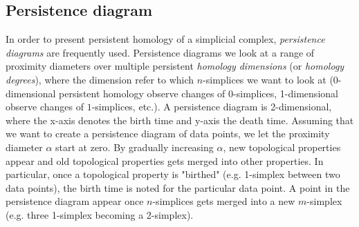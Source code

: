 \subsection{Persistence diagram}
\label{sec:persistence diagram}
In order to present persistent homology of a simplicial complex, \textit{persistence diagrams} are frequently used. Persistence diagrams we look at a range of proximity diameters over multiple persistent \textit{homology dimensions} (or \textit{homology degrees}), where the dimension refer to which $n$-simplices we want to look at (0-dimensional persistent homology observe changes of $0$-simplices, 1-dimensional observe changes of $1$-simplices, etc.). A persistence diagram is 2-dimensional, where the x-axis denotes the birth time and y-axis the death time. Assuming that we want to create a persistence diagram of data points, we let the proximity diameter $\alpha$ start at zero. By gradually increasing $\alpha$, new topological properties appear and old topological properties gets merged into other properties. In particular, once a topological property is "birthed" (e.g. 1-simplex between two data points), the birth time is noted for the particular data point. A point in the persistence diagram appear once $n$-simplices gets merged into a new $m$-simplex (e.g. three 1-simplex becoming a 2-simplex).

